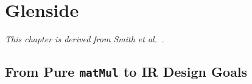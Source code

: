 





\chapter{Glenside}
\label{chapter:part1-glenside}

\textit{This chapter is derived from Smith et al.~\cite{smith2021pure}.}



\section{From Pure \texttt{matMul} to IR Design Goals}
\label{sec:matmul}

  
